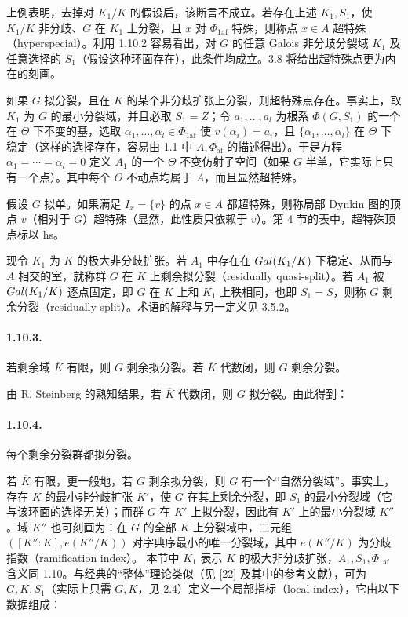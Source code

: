 上例表明，去掉对 $K_1/K$ 的假设后，该断言不成立。若存在上述 $K_1,S_1$，使 $K_1/K$ 非分歧、$G$ 在 $K_1$ 上分裂，且 $x$ 对 $\Phi_{1\mathrm{af}}$ 特殊，则称点 $x\in A$ 超特殊（hyperspecial）。利用 1.10.2 容易看出，对 $G$ 的任意 Galois 非分歧分裂域 $K_1$ 及任意选择的 $S_1$（假设这种环面存在），此条件均成立。3.8 将给出超特殊点更为内在的刻画。

如果 $G$ 拟分裂，且在 $K$ 的某个非分歧扩张上分裂，则超特殊点存在。事实上，取 $K_1$ 为 $G$ 的最小分裂域，并且必取 $S_1=Z$；令 $a_1,\ldots,a_l$ 为根系 $\Phi(G,S_1)$ 的一个在 $\Theta$ 下不变的基，选取 $\alpha_1,\ldots,\alpha_l\in\Phi_{1\mathrm{af}}$ 使 $v(\alpha_i)=a_i$，且 $\{\alpha_1,\ldots,\alpha_l\}$ 在 $\Theta$ 下稳定（这样的选择存在，容易由 1.1 中 $A,\Phi_{\mathrm{af}}$ 的描述得出）。于是方程 $\alpha_1=\cdots=\alpha_l=0$ 定义 $A_1$ 的一个 $\Theta$ 不变仿射子空间（如果 $G$ 半单，它实际上只有一个点）。其中每个 $\Theta$ 不动点均属于 $A$，而且显然超特殊。

假设 $G$ 拟单。如果满足 $I_x=\{v\}$ 的点 $x\in A$ 都超特殊，则称局部 Dynkin 图的顶点 $v$（相对于 $G$）超特殊（显然，此性质只依赖于 $v$）。第 4 节的表中，超特殊顶点标以 hs。

现令 $K_1$ 为 $K$ 的极大非分歧扩张。若 $A_1$ 中存在在 $Gal(K_1/K)$ 下稳定、从而与 $A$ 相交的室，就称群 $G$ 在 $K$ 上剩余拟分裂（residually quasi-split）。若 $A_1$ 被 $Gal(K_1/K)$ 逐点固定，即 $G$ 在 $K$ 上和 $K_1$ 上秩相同，也即 $S_1=S$，则称 $G$ 剩余分裂（residually split）。术语的解释与另一定义见 3.5.2。

\paragraph*{1.10.3.}若剩余域 $\overline K$ 有限，则 $G$ 剩余拟分裂。若 $\overline K$ 代数闭，则 $G$ 剩余分裂。

由 R. Steinberg 的熟知结果，若 $\overline K$ 代数闭，则 $G$ 拟分裂。由此得到：

\paragraph*{1.10.4.}每个剩余分裂群都拟分裂。

若 $\overline K$ 有限，更一般地，若 $G$ 剩余拟分裂，则 $G$ 有一个“自然分裂域”。事实上，存在 $K$ 的最小非分歧扩张 $K'$，使 $G$ 在其上剩余分裂，即 $S_1$ 的最小分裂域（它与该环面的选择无关）；而群 $G$ 在 $K'$ 上拟分裂，因此有 $K'$ 上的最小分裂域 $K''$。域 $K''$ 也可刻画为：在 $G$ 的全部 $K$ 上分裂域中，二元组 $([K'':K],e(K''/K))$ 对字典序最小的唯一分裂域，其中 $e(K''/K)$ 为分歧指数（ramification index）。
本节中 $K_1$ 表示 $K$ 的极大非分歧扩张，$A_1,S_1,\Phi_{1\mathrm{af}}$ 含义同 1.10。与经典的“整体”理论类似（见 [22] 及其中的参考文献），可为 $G,K,S_1$（实际上只需 $G,K$，见 2.4）定义一个局部指标（local index），它由以下数据组成：

